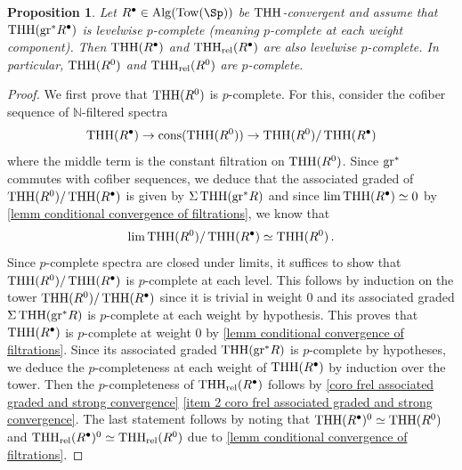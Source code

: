 \documentclass[english,10pt]{amsart}
\newcommand{\rel}{\textup{rel}}
\newtheorem{prop}{Proposition}[section]
\theoremstyle{definition}
\numberwithin{equation}{section}
\DeclareMathOperator{\thh}{\ensuremath{\textup{THH}}}
\newcommand{\THH}{\thh}
\newcommand{\rthh}{\mathrm{THH}_{\rel}}
\newcommand{\Tow}{\mathrm{Tow}}
\newcommand{\Alg}{\mathrm{Alg}}
\newcommand{\gr}{\textup{gr}^*}
\begin{document}
\begin{prop}\label{lemm thh is p complete when thh gr is}
Let $R^{\bullet}\in \Alg(\Tow(\Sp))$ be $\thh$-convergent and assume that 
$\thh(\gr R^{\bullet})$ is levelwise $p$-complete (meaning $p$-complete at each weight component). Then $\thh(R^{\bullet})$ and $\rthh(R^{\bullet})$ are also levelwise $p$-complete. In particular, $\THH(R^0)$ and $\rthh(R^0)$ are $p$-complete. 
\end{prop}
\begin{proof}
We first prove that $\THH(R^0)$ is $p$-complete. For this, consider the cofiber sequence of $\mathbb{N}$-filtered spectra 
\[\thh(R^{\bullet}) \to \textup{cons}(\thh(R^0)) \to \thh(R^0)/\thh(R^{\bullet}) \]
where the middle term is the constant filtration on $\thh(R^0)$. Since $\gr$ commutes with cofiber sequences, we deduce that the associated graded of $\thh(R^0)/\thh(R^{\bullet})$ is given by $\Sigma \THH(\gr R)$ and since $\lim \thh(R^\bullet)\simeq 0$ by 
\autoref{lemm conditional convergence of filtrations}, we know that 
\[ \lim \THH(R^0)/\THH(R^{\bullet})\simeq \THH(R^0)\,.\]
Since $p$-complete spectra are closed under limits, it suffices to show that $\THH(R^0)/\THH(R^{\bullet})$ is $p$-complete at each level. This follows by induction on the tower $\THH(R^0)/\THH(R^{\bullet})$ since it is trivial in weight $0$ and its associated graded $\Sigma \THH(\gr R)$ is $p$-complete at each weight by hypothesis. This proves that $\THH(R^{\bullet})$ is $p$-complete at weight $0$ by \autoref{lemm conditional convergence of filtrations}. Since its associated graded $\THH(\gr R)$ is $p$-complete by hypotheses, we deduce the $p$-completeness at each weight of $\THH(R^{\bullet})$ by induction over the tower.  Then the $p$-completeness of $\rthh(R^\bullet)$ follows by \autoref{coro frel associated graded and strong convergence} \eqref{item 2 coro frel associated graded and strong convergence}. The last statement follows by noting that $\thh(R^\bullet)^0 \simeq \thh(R^0)$ and $\rthh(R^\bullet)^0 \simeq \rthh(R^0)$ due to \autoref{lemm conditional convergence of filtrations}.
\end{proof}
\end{document}
